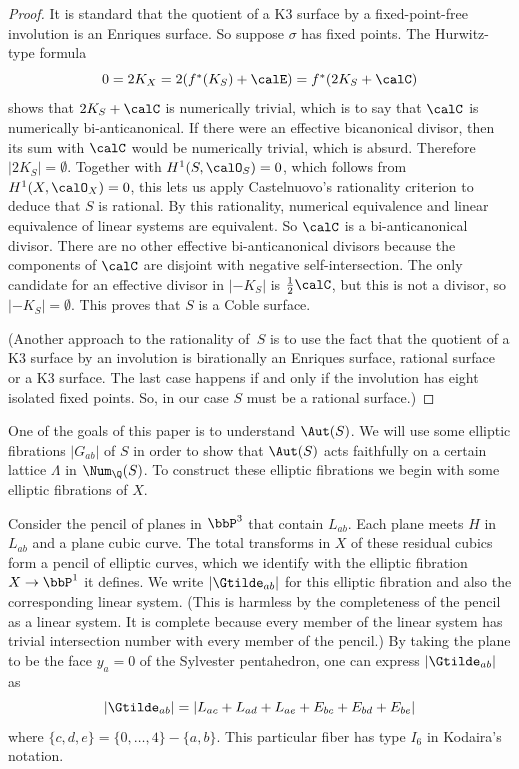 \begin{proof}
It is standard that the quotient of a K3 surface by a fixed-point-free involution is an Enriques surface. So suppose $\sigma$ has fixed points. The Hurwitz-type formula
\begin{equation*}
\textstyle 0=2K_X=2(f^*(K_S)+\calE)=f^*(2K_S+\calC)
\end{equation*}
shows that $2K_S+\calC$ is numerically trivial, which is to say that $\calC$ is numerically bi-anticanonical. If there were an effective bicanonical divisor, then its sum with $\calC$ would be numerically trivial, which is absurd. Therefore $|2K_S|=\emptyset$. Together with $H^1(S,\calO_S) = 0$, which follows from $H^1(X,\calO_X) = 0$, this lets us apply Castelnuovo's rationality criterion to deduce that $S$ is rational. By this rationality, numerical equivalence and linear equivalence of linear systems are equivalent. So $\calC$ is a bi-anticanonical divisor. There are no other effective bi-anticanonical divisors because the components of $\calC$ are disjoint with negative self-intersection. The only candidate for an effective divisor in $\mathopen|-K_S|$ is $\frac12\calC$, but this is not a divisor, so $\mathopen|-K_S|=\emptyset$. This proves that $S$ is a Coble surface.

(Another approach to the rationality of~$S$ is to use the fact that the quotient of a K3 surface by an involution is birationally an Enriques surface, rational surface or a K3 surface. The last case happens if and only if the involution has eight isolated fixed points. So, in our case $S$ must be a rational surface.)
\end{proof}

One of the goals of this paper is to understand $\Aut(S)$. We will use some elliptic fibrations $|G_{ab}|$ of $S$ in order to show that $\Aut(S)$ acts faithfully on a certain lattice $\Lambda$ in $\Num_\Q(S)$. To construct these elliptic fibrations we begin with some elliptic fibrations of $X$.

Consider the pencil of planes in $\bbP^3$ that contain $L_{ab}$. Each plane meets $H$ in $L_{ab}$ and a plane cubic curve. The total transforms in $X$ of these residual cubics form a pencil of elliptic curves, which we identify with the elliptic fibration $X\to \bbP^1$ it defines. We write $|\Gtilde_{ab}|$ for this elliptic fibration and also the corresponding linear system. (This is harmless by the completeness of the pencil as a linear system. It is complete because every member of the linear system has trivial intersection number with every member of the pencil.) By taking the plane to be the face $y_a=0$ of the Sylvester pentahedron, one can express $|\Gtilde_{ab}|$ as
\begin{equation}\label{EqLinearSystem}
|\Gtilde_{ab}|=|L_{ac}+L_{ad}+L_{ae}+E_{bc}+E_{bd}+E_{be}|
\end{equation}
where $\{c,d,e\}=\{0,\dots,4\}-\{a,b\}$. This particular fiber has type $I_6$ in Kodaira's notation.

